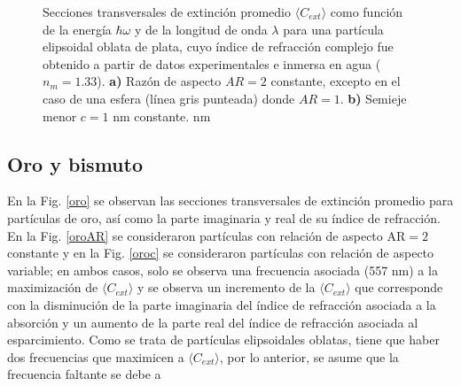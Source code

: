 \begin{figure}[h!]
	\quad%
	\caption{Secciones transversales de extinción promedio $\langle C_{ext}\rangle$ como función de la energía $\hbar\omega$ y de la longitud de onda $\lambda$ para una partícula elipsoidal oblata de plata, cuyo índice de refracción complejo fue obtenido a partir de datos experimentales  e inmersa en agua ($n_m=1.33$). \textbf{a)} Razón de aspecto $AR=2$ constante, excepto en el caso de una esfera (línea gris punteada) donde $AR=1$. \textbf{b)} Semieje menor $c=1$ nm constante. nm}\label{plata}
\end{figure}

\subsection*{Oro y bismuto}
En la Fig. \ref{oro} se observan las secciones transversales de extinción promedio para partículas de oro, así como la parte imaginaria y real de su índice de refracción. En la Fig. \ref{oroAR} se consideraron partículas con relación de aspecto AR$=2$ constante y en la Fig. \ref{oroc} se consideraron partículas con relación de aspecto variable; en ambos casos, solo se observa una frecuencia asociada (557 nm) a la maximización de $\langle C_{ext}\rangle$ y se observa un incremento de la $\langle C_{ext}\rangle$ que corresponde con la disminución de la parte imaginaria del índice de refracción asociada a la absorción y un aumento de la parte real del índice de refracción asociada al esparcimiento. Como se trata de partículas elipsoidales oblatas, tiene que haber dos frecuencias que maximicen a $\langle C_{ext}\rangle$, por lo anterior, se asume que la frecuencia faltante se debe a 


